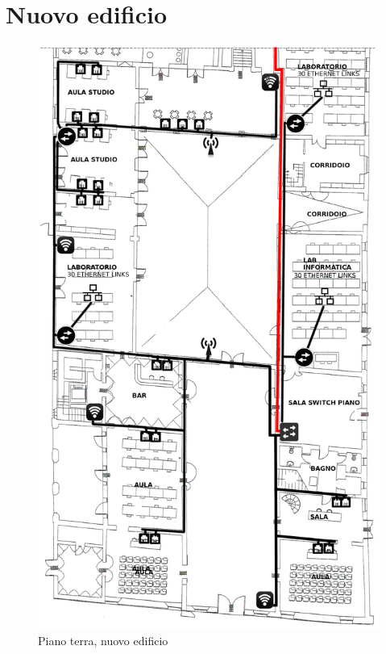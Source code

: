 \documentclass[11pt, a4paper, oneside]{article}
\begin{document}
		\section{Nuovo edificio}
			\begin{figure}[H]
				\caption{Piano terra, nuovo edificio}
				\includegraphics[scale=0.2]{architecture-004.png}
			\end{figure}
\end{document}

